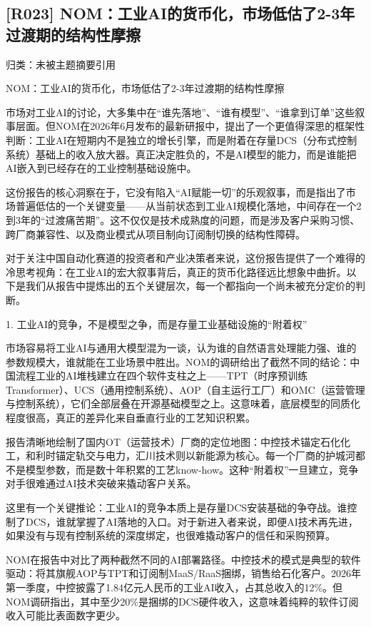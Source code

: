 \documentclass[11pt]{ctexart}
\begin{document}
\subsection{[R023] NOM：工业AI的货币化，市场低估了2-3年过渡期的结构性摩擦}
{\small\color{refgray}归类：未被主题摘要引用}

NOM：工业AI的货币化，市场低估了2-3年过渡期的结构性摩擦

市场对工业AI的讨论，大多集中在“谁先落地”、“谁有模型”、“谁拿到订单”这些叙事层面。但NOM在2026年6月发布的最新研报中，提出了一个更值得深思的框架性判断：工业AI在短期内不是独立的增长引擎，而是附着在存量DCS（分布式控制系统）基础上的收入放大器。真正决定胜负的，不是AI模型的能力，而是谁能把AI嵌入到已经存在的工业控制基础设施中。

这份报告的核心洞察在于，它没有陷入“AI赋能一切”的乐观叙事，而是指出了市场普遍低估的一个关键变量——从当前状态到工业AI规模化落地，中间存在一个2到3年的“过渡痛苦期”。这不仅仅是技术成熟度的问题，而是涉及客户采购习惯、跨厂商兼容性、以及商业模式从项目制向订阅制切换的结构性障碍。

对于关注中国自动化赛道的投资者和产业决策者来说，这份报告提供了一个难得的冷思考视角：在工业AI的宏大叙事背后，真正的货币化路径远比想象中曲折。以下是我们从报告中提炼出的五个关键层次，每一个都指向一个尚未被充分定价的判断。

1. 工业AI的竞争，不是模型之争，而是存量工业基础设施的“附着权”

市场容易将工业AI与通用大模型混为一谈，认为谁的自然语言处理能力强、谁的参数规模大，谁就能在工业场景中胜出。NOM的调研给出了截然不同的结论：中国流程工业的AI堆栈建立在四个软件支柱之上——TPT（时序预训练Transformer）、UCS（通用控制系统）、AOP（自主运行工厂）和OMC（运营管理与控制系统），它们全部层叠在开源基础模型之上。这意味着，底层模型的同质化程度很高，真正的差异化来自垂直行业的工艺知识积累。

报告清晰地绘制了国内OT（运营技术）厂商的定位地图：中控技术锚定石化化工，和利时锚定轨交与电力，汇川技术则以新能源为核心。每一个厂商的护城河都不是模型参数，而是数十年积累的工艺know-how。这种“附着权”一旦建立，竞争对手很难通过AI技术突破来撬动客户关系。

这里有一个关键推论：工业AI的竞争本质上是存量DCS安装基础的争夺战。谁控制了DCS，谁就掌握了AI落地的入口。对于新进入者来说，即便AI技术再先进，如果没有与现有控制系统的深度绑定，也很难撬动客户的信任和采购预算。

NOM在报告中对比了两种截然不同的AI部署路径。中控技术的模式是典型的软件驱动：将其旗舰AOP与TPT和订阅制MaaS/RaaS捆绑，销售给石化客户。2026年第一季度，中控披露了1.84亿元人民币的工业AI收入，占其总收入的12\%。但NOM调研指出，其中至少20\%是捆绑的DCS硬件收入，这意味着纯粹的软件订阅收入可能比表面数字更少。
\end{document}
